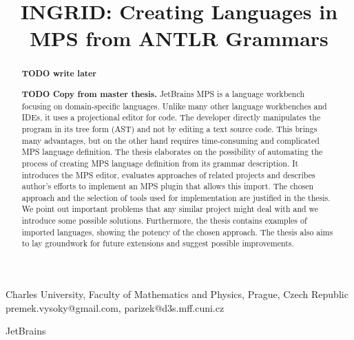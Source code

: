\documentclass[preprint,10pt]{sigplanconf}
\newcommand{\todo}[1]{{\bfseries TODO #1}}
\begin{document}


\title{INGRID: Creating Languages in MPS from ANTLR Grammars}


	{Charles University, Faculty of Mathematics and Physics, Prague, Czech Republic}
	{premek.vysoky@gmail.com, parizek@d3s.mff.cuni.cz}

	{JetBrains}


\maketitle

\begin{abstract}
\todo{write later}

\todo{Copy from master thesis.}
JetBrains MPS is a language workbench focusing on domain-specific languages.
Unlike many other language workbenches and IDEs, it uses a projectional editor for code.
The developer directly manipulates the program in its tree form (AST) and not by editing a text source code.
This brings many advantages, but on the other hand requires time-consuming and complicated MPS language definition.
The thesis elaborates on the possibility of automating the process of creating MPS language definition from its grammar description.
It introduces the MPS editor, evaluates approaches of related projects and describes author's efforts to implement an MPS plugin that allows this import.
The chosen approach and the selection of tools used for implementation are justified in the thesis.
We point out important problems that any similar project might deal with and we introduce some possible solutions.
Furthermore, the thesis contains examples of imported languages, showing the potency of the chosen approach.
The thesis also aims to lay groundwork for future extensions and suggest possible improvements.
\end{abstract}


\end{document}
